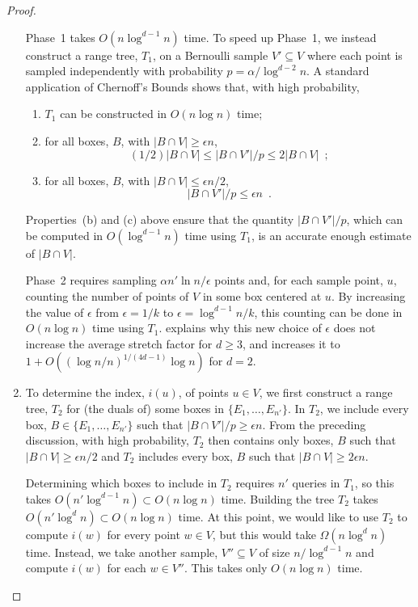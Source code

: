 \documentclass{patmorin}
\begin{document}
\begin{proof}
\begin{enumerate}
     Phase~1 takes $O(n\log^{d-1} n)$ time.  To speed up Phase~1,
     we instead construct a range tree, $T_1$, on a Bernoulli sample
     $V'\subseteq V$ where each point is sampled independently with
     probability $p=\alpha/\log^{d-2} n$.  A standard application of
     Chernoff's Bounds \cite[Appendix~A.1]{alon.spencer:probabilistic}
     shows that, with high probability,
     \begin{enumerate}
       \item $T_1$ can be constructed in $O(n\log n)$ time;
       \item for all boxes, $B$, with $|B\cap V|\ge \epsilon n$,
       \[  
           (1/2)|B\cap V|\le  |B\cap V'|/p \le 2|B\cap V| \enspace;
       \]
       \item for all boxes, $B$, with $|B\cap V|\le \epsilon n/2$,
       \[    
           |B\cap V'|/p \le \epsilon n \enspace .
       \]
     \end{enumerate}
     Properties~(b) and (c) above ensure that the quantity $|B\cap V'|/p$,
     which can be computed in $O(\log^{d-1} n)$ time using $T_1$, is an
     accurate enough estimate of $|B\cap V|$.

     Phase~2 requires sampling $\alpha n'\ln n/\epsilon$ points and,
     for each sample point, $u$, counting the number of points of $V$
     in some box centered at $u$.  By increasing the value of $\epsilon$
     from $\epsilon=1/k$ to $\epsilon=\log^{d-1} n/k$, this counting can
     be done in $O(n\log n)$ time using $T_1$.  
     explains why this new choice of $\epsilon$ does not increase the
     average stretch factor for $d\ge 3$, and increases it to $1+O((\log
     n/n)^{1/(4d-1)}\log n)$ for $d=2$.

    \item To determine the index, $i(u)$, of points $u\in V$, we
      first construct a range tree, $T_2$ for (the duals of) some boxes
      in  $\{E_1,\ldots,E_{n'}\}$.  In $T_2$, we include every box,
      $B\in\{E_1,\ldots,E_{n'}\}$ such that $|B\cap V'|/p\ge\epsilon n$.
      From the preceding discussion, with high probability, $T_2$ then
      contains only boxes, $B$ such that $|B\cap V|\ge \epsilon n/2$ and
      $T_2$ includes every box, $B$ such that $|B\cap V|\ge 2\epsilon n$.

      Determining which boxes to include in $T_2$ requires $n'$ queries
      in $T_1$, so this takes $O(n'\log^{d-1} n)\subset O(n\log n)$ time.
      Building the tree $T_2$ takes $O(n'\log^{d} n)\subset O(n\log n)$
      time.  At this point, we would like to use $T_2$ to compute $i(w)$
      for every point $w\in V$, but this would take $\Omega(n\log^d
      n)$ time.  Instead, we take another sample, $V''\subseteq V$
      of size $n/\log^{d-1} n$ and compute $i(w)$ for each $w\in V''$.
      This takes only $O(n\log n)$ time.


\end{enumerate}
\end{proof}
\end{document}

